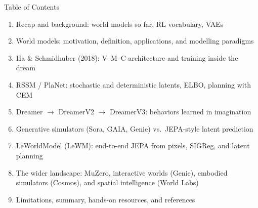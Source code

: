 \begin{frame}{Table of Contents}
  \begin{enumerate}\itemsep0.15em
    \item Recap and background: world models so far, RL vocabulary, VAEs
    \item World models: motivation, definition, applications, and modelling paradigms
    \item Ha \& Schmidhuber (2018): V--M--C architecture and training inside the dream
    \item RSSM / PlaNet: stochastic and deterministic latents, ELBO, planning with CEM
    \item Dreamer $\rightarrow$ DreamerV2 $\rightarrow$ DreamerV3: behaviors learned in imagination
    \item Generative simulators (Sora, GAIA, Genie) vs.\ JEPA-style latent prediction
    \item LeWorldModel (LeWM): end-to-end JEPA from pixels, SIGReg, and latent planning
    \item The wider landscape: MuZero, interactive worlds (Genie), embodied simulators (Cosmos), and spatial intelligence (World Labs)
    \item Limitations, summary, hands-on resources, and references
  \end{enumerate}
\end{frame}
